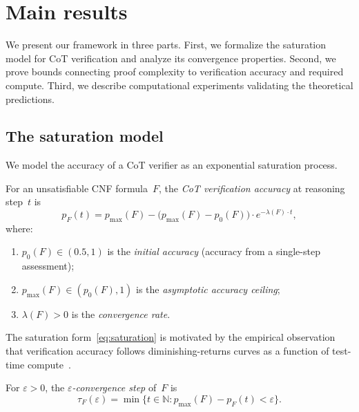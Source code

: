 \section{Main results}\label{sec:main}

We present our framework in three parts.  First, we formalize the saturation
model for CoT verification and analyze its convergence properties.  Second, we
prove bounds connecting proof complexity to verification accuracy and required
compute.  Third, we describe computational experiments validating the
theoretical predictions.

\subsection{The saturation model}\label{sec:saturation}

We model the accuracy of a CoT verifier as an exponential saturation process.

\begin{definition}\label{def:cot-process}
For an unsatisfiable CNF formula~$F$, the \emph{CoT verification accuracy} at
reasoning step~$t$ is
\begin{equation}\label{eq:saturation}
p_F(t) = p_{\max}(F) - \bigl(p_{\max}(F) - p_0(F)\bigr) \cdot e^{-\lambda(F) \cdot t},
\end{equation}
where:
\begin{enumerate}[label=(\roman*)]
\item $p_0(F) \in (0.5, 1)$ is the \emph{initial accuracy} (accuracy from a
  single-step assessment);
\item $p_{\max}(F) \in (p_0(F), 1)$ is the \emph{asymptotic accuracy ceiling};
\item $\lambda(F) > 0$ is the \emph{convergence rate}.
\end{enumerate}
\end{definition}

The saturation form~\eqref{eq:saturation} is motivated by the empirical
observation that verification accuracy follows diminishing-returns curves as
a function of test-time compute~\cite{snell2024scaling, shi2025heimdall}.

\begin{definition}\label{def:convergence-step}
For $\varepsilon > 0$, the \emph{$\varepsilon$-convergence step} of~$F$ is
\[
\tau_F(\varepsilon) = \min\bigl\{t \in \mathbb{N} :
  p_{\max}(F) - p_F(t) < \varepsilon\bigr\}.
\]
\end{definition}

